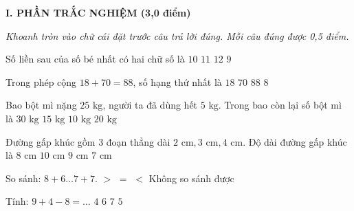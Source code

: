 
\setcounter{ex}{0}
\setcounter{bt}{0}

\textbf{\large I. PHẦN TRẮC NGHIỆM (3,0 điểm)}

{\itshape Khoanh tròn vào chữ cái đặt trước câu trả lời đúng. Mỗi câu đúng được 0,5 điểm.}

\begin{ex} %
Số liền sau của số bé nhất có hai chữ số là
\choice
{$10$}
{\True $11$}
{$12$}
{$9$}
\end{ex}

\begin{ex} %
Trong phép cộng $18 + 70 = 88$, số hạng thứ nhất là
\choice
{\True $18$}
{$70$}
{$88$}
{$8$}
\end{ex}

\begin{ex} %
Bao bột mì nặng $25\text{ kg}$, người ta đã dùng hết $5\text{ kg}$. Trong bao còn lại số bột mì là
\choice
{$30\text{ kg}$}
{$15\text{ kg}$}
{$10\text{ kg}$}
{\True $20\text{ kg}$}
\end{ex}

\begin{ex} %
Đường gấp khúc gồm $3$ đoạn thẳng dài $2\text{ cm}, 3\text{ cm}, 4\text{ cm}$. Độ dài đường gấp khúc là
\choice
{$8\text{ cm}$}
{$10\text{ cm}$}
{\True $9\text{ cm}$}
{$7\text{ cm}$}
\end{ex}

\begin{ex} %
So sánh: $8 + 6 \dots 7 + 7$.
\choice
{$>$}
{\True $=$}
{$<$}
{Không so sánh được}
\end{ex}

\begin{ex} %
Tính: $9 + 4 - 8 = \dots$
\choice
{$4$}
{$6$}
{$7$}
{\True $5$}
\end{ex}

